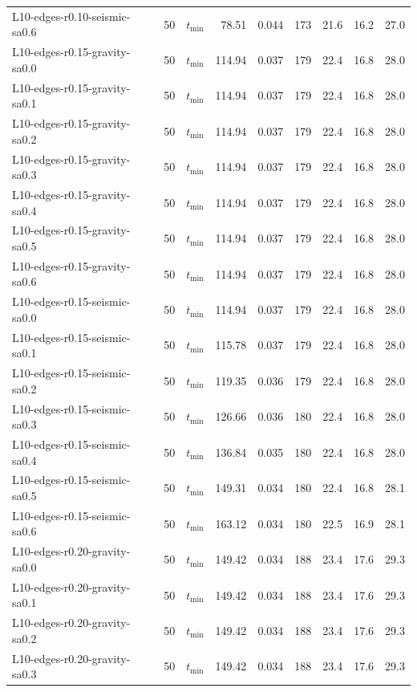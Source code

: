 \begin{longtable}{lrlrrrrrr}
L10-edges-r0.10-seismic-sa0.6 & 50 & $t_{\mathrm{min}}$ & 78.51 & 0.044 & 173 & 21.6 & 16.2 & 27.0 \\
L10-edges-r0.15-gravity-sa0.0 & 50 & $t_{\mathrm{min}}$ & 114.94 & 0.037 & 179 & 22.4 & 16.8 & 28.0 \\
L10-edges-r0.15-gravity-sa0.1 & 50 & $t_{\mathrm{min}}$ & 114.94 & 0.037 & 179 & 22.4 & 16.8 & 28.0 \\
L10-edges-r0.15-gravity-sa0.2 & 50 & $t_{\mathrm{min}}$ & 114.94 & 0.037 & 179 & 22.4 & 16.8 & 28.0 \\
L10-edges-r0.15-gravity-sa0.3 & 50 & $t_{\mathrm{min}}$ & 114.94 & 0.037 & 179 & 22.4 & 16.8 & 28.0 \\
L10-edges-r0.15-gravity-sa0.4 & 50 & $t_{\mathrm{min}}$ & 114.94 & 0.037 & 179 & 22.4 & 16.8 & 28.0 \\
L10-edges-r0.15-gravity-sa0.5 & 50 & $t_{\mathrm{min}}$ & 114.94 & 0.037 & 179 & 22.4 & 16.8 & 28.0 \\
L10-edges-r0.15-gravity-sa0.6 & 50 & $t_{\mathrm{min}}$ & 114.94 & 0.037 & 179 & 22.4 & 16.8 & 28.0 \\
L10-edges-r0.15-seismic-sa0.0 & 50 & $t_{\mathrm{min}}$ & 114.94 & 0.037 & 179 & 22.4 & 16.8 & 28.0 \\
L10-edges-r0.15-seismic-sa0.1 & 50 & $t_{\mathrm{min}}$ & 115.78 & 0.037 & 179 & 22.4 & 16.8 & 28.0 \\
L10-edges-r0.15-seismic-sa0.2 & 50 & $t_{\mathrm{min}}$ & 119.35 & 0.036 & 179 & 22.4 & 16.8 & 28.0 \\
L10-edges-r0.15-seismic-sa0.3 & 50 & $t_{\mathrm{min}}$ & 126.66 & 0.036 & 180 & 22.4 & 16.8 & 28.0 \\
L10-edges-r0.15-seismic-sa0.4 & 50 & $t_{\mathrm{min}}$ & 136.84 & 0.035 & 180 & 22.4 & 16.8 & 28.0 \\
L10-edges-r0.15-seismic-sa0.5 & 50 & $t_{\mathrm{min}}$ & 149.31 & 0.034 & 180 & 22.4 & 16.8 & 28.1 \\
L10-edges-r0.15-seismic-sa0.6 & 50 & $t_{\mathrm{min}}$ & 163.12 & 0.034 & 180 & 22.5 & 16.9 & 28.1 \\
L10-edges-r0.20-gravity-sa0.0 & 50 & $t_{\mathrm{min}}$ & 149.42 & 0.034 & 188 & 23.4 & 17.6 & 29.3 \\
L10-edges-r0.20-gravity-sa0.1 & 50 & $t_{\mathrm{min}}$ & 149.42 & 0.034 & 188 & 23.4 & 17.6 & 29.3 \\
L10-edges-r0.20-gravity-sa0.2 & 50 & $t_{\mathrm{min}}$ & 149.42 & 0.034 & 188 & 23.4 & 17.6 & 29.3 \\
L10-edges-r0.20-gravity-sa0.3 & 50 & $t_{\mathrm{min}}$ & 149.42 & 0.034 & 188 & 23.4 & 17.6 & 29.3 \\

\end{longtable}
